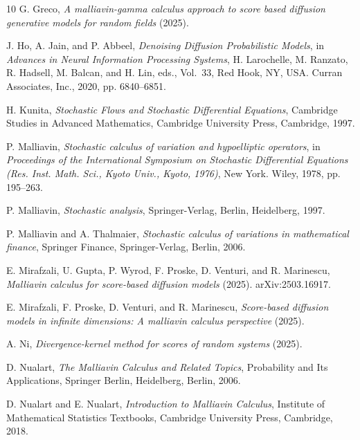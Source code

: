 \documentclass[]{interact}
\newcommand{\1}{\mathbf{1}}
\theoremstyle{plain}%
\theoremstyle{definition}
\theoremstyle{remark}
\numberwithin{equation}{section}
\begin{document}
\begin{thebibliography}{10}
G. Greco, \emph{A malliavin-gamma calculus approach to score based diffusion generative models for random fields} (2025).

J. Ho, A. Jain, and P. Abbeel, \emph{Denoising Diffusion Probabilistic Models}, in \emph{Advances in Neural Information Processing Systems}, H. Larochelle, M. Ranzato, R. Hadsell, M. Balcan, and H. Lin, eds., Vol.~33, Red Hook, NY, USA. Curran Associates, Inc., 2020, pp. 6840--6851.

H. Kunita, \emph{Stochastic Flows and Stochastic Differential Equations}, Cambridge Studies in Advanced Mathematics, Cambridge University Press, Cambridge, 1997.

P. Malliavin, \emph{Stochastic calculus of variation and hypoelliptic operators}, in \emph{Proceedings of the {I}nternational {S}ymposium on {S}tochastic {D}ifferential {E}quations ({R}es. {I}nst. {M}ath. {S}ci., {K}yoto {U}niv., {K}yoto, 1976)}, New York. Wiley, 1978, pp. 195--263. 

P. Malliavin, \emph{Stochastic analysis}, Springer-Verlag, Berlin, Heidelberg, 1997.

P. Malliavin and A. Thalmaier, \emph{Stochastic calculus of variations in mathematical finance}, Springer Finance, Springer-Verlag, Berlin, 2006. 

E. Mirafzali, U. Gupta, P. Wyrod, F. Proske, D. Venturi, and R. Marinescu, \emph{Malliavin calculus for score-based diffusion models} (2025). arXiv:2503.16917.

E. Mirafzali, F. Proske, D. Venturi, and R. Marinescu, \emph{Score-based diffusion models in infinite dimensions: A malliavin calculus perspective} (2025).

A. Ni, \emph{Divergence-kernel method for scores of random systems} (2025).

D. Nualart, \emph{The Malliavin Calculus and Related Topics}, Probability and Its Applications, Springer Berlin, Heidelberg, Berlin, 2006.

D. Nualart and E. Nualart, \emph{Introduction to Malliavin Calculus}, Institute of Mathematical Statistics Textbooks, Cambridge University Press, Cambridge, 2018.


\end{thebibliography}
\end{document}
